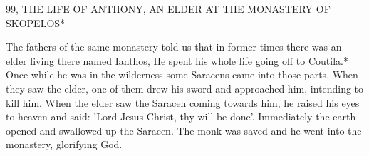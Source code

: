 99, THE LIFE OF ANTHONY, AN ELDER AT THE
MONASTERY OF SKOPELOS*

The fathers of the same monastery told us that in former times there
was an elder living there named Ianthos, He spent his whole life
going off to Coutila.* Once while he was in the wilderness some
Saracens came into those parts.
When they saw the elder, one of
them drew his sword and approached him, intending to kill him.
When the elder saw the Saracen coming towards him, he raised his
eyes to heaven and said: 'Lord Jesus Christ, thy will be done'.
Immediately the earth opened and swallowed up the Saracen.
The
monk was saved and he went into the monastery, glorifying God.

